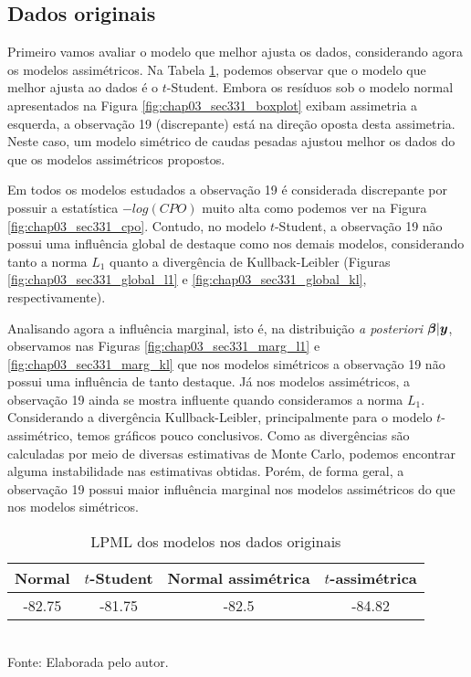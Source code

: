 \subsection{Dados originais}

Primeiro vamos avaliar o modelo que melhor ajusta os dados, considerando agora os modelos assimétricos. Na Tabela \ref{tab:chap03_sec331_lpml}, podemos observar que o modelo que melhor ajusta ao dados é o $t$-Student. Embora os resíduos sob o modelo normal apresentados na Figura \ref{fig:chap03_sec331_boxplot} exibam assimetria a esquerda, a observação 19 (discrepante) está na direção oposta desta assimetria. Neste caso, um modelo simétrico de caudas pesadas ajustou melhor os dados do que os modelos assimétricos propostos.

Em todos os modelos estudados a observação 19 é considerada discrepante por possuir a estatística $-log(CPO)$ muito alta como podemos ver na Figura \ref{fig:chap03_sec331_cpo}. Contudo, no modelo $t$-Student, a observação 19 não possui uma influência global de destaque como nos demais modelos, considerando tanto a norma $L_1$ quanto a divergência de Kullback-Leibler (Figuras \ref{fig:chap03_sec331_global_l1} e \ref{fig:chap03_sec331_global_kl}, respectivamente).

Analisando agora a influência marginal, isto é, na distribuição \textit{a posteriori} ${\boldsymbol{\beta}}|{\boldsymbol{y}}$, observamos nas Figuras \ref{fig:chap03_sec331_marg_l1} e \ref{fig:chap03_sec331_marg_kl} que nos modelos simétricos a observação 19 não possui uma influência de tanto destaque. Já nos modelos assimétricos, a observação 19 ainda se mostra influente quando consideramos a norma $L_1$. Considerando a divergência Kullback-Leibler, principalmente para o modelo $t$-assimétrico, temos gráficos pouco conclusivos. Como as divergências são calculadas por meio de diversas estimativas de Monte Carlo, podemos encontrar alguma instabilidade nas estimativas obtidas. Porém, de forma geral, a observação 19 possui maior influência marginal nos modelos assimétricos do que nos modelos simétricos.

\begin{table}[H]
\begin{center}
\caption{LPML dos modelos nos dados originais}
\label{tab:chap03_sec331_lpml}
\begin{tabular}{cccc}
 Normal & $t$-Student & Normal assimétrica  & $t$-assimétrica \\ \hline
-82.75 & -81.75 & -82.5 & -84.82 \\ \hline
\end{tabular}
\\
Fonte: Elaborada pelo autor.
\end{center}
\end{table}

